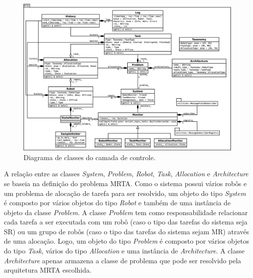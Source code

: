        \begin{figure}[p]
            \centering
            \includegraphics[height=\textwidth,angle=90]{Figuras/3_desenvolvimento/rqt_mrta_controller_uml.eps}
            \caption{Diagrama de classes do camada de controle.} \label{fig:rqt_mrta_controller_uml}
        \end{figure}
        
        A relação entre as classes \textit{System}, \textit{Problem}, \textit{Robot}, \textit{Task}, \textit{Allocation} e \textit{Architecture} se baseia na definição do problema MRTA. Como o sistema possui vários robôs e um problema de alocação de tarefa para ser resolvido, um objeto do tipo \textit{System} é composto por vários objetos do tipo \textit{Robot} e também de uma instância de objeto da classe \textit{Problem}. A classe \textit{Problem} tem como responsabilidade relacionar cada tarefa a ser executada com um robô (caso o tipo das tarefas do sistema seja SR) ou um grupo de robôs (caso o tipo das tarefas do sistema sejam MR) através de uma alocação. Logo, um objeto do tipo \textit{Problem} é composto por vários objetos do tipo \textit{Task}, vários do tipo \textit{Allocation} e uma instância de \textit{Architecture}. A classe \textit{Architecture} apenas armazena a classe de problema que pode ser resolvido pela arquitetura MRTA escolhida. 
        

